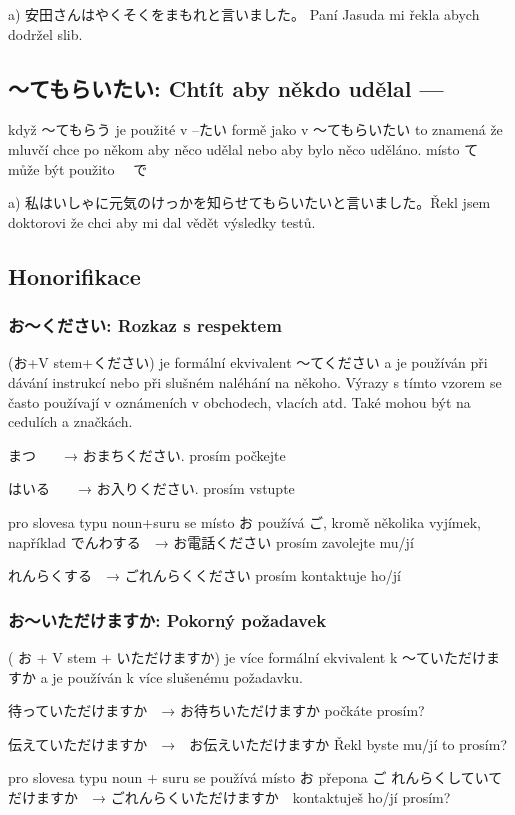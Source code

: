 a) 安田さんはやくそくをまもれと言いました。 Paní Jasuda mi řekla abych dodržel slib.

\subsection{〜てもらいたい: Chtít aby někdo udělal ---}

když 〜てもらう je použité v --たい formě jako v 〜てもらいたい to znamená že mluvčí chce po někom aby něco udělal nebo aby bylo něco uděláno. místo て může být použito 　で

a) 私はいしゃに元気のけっかを知らせてもらいたいと言いました。Řekl jsem doktorovi že chci aby mi dal vědět výsledky testů.

\subsection{Honorifikace}

\subsubsection{お〜ください: Rozkaz s respektem}
(お+V stem+ください) je formální ekvivalent 〜てください a je používán při dávání instrukcí nebo při slušném naléhání na někoho. Výrazy s tímto vzorem se často používají v oznámeních v obchodech, vlacích atd. Také mohou být na cedulích a značkách.

まつ　　→   おまちください.    prosím počkejte

はいる　　→  お入りください.  prosím vstupte

pro slovesa typu noun+suru se místo お používá ご, kromě několika vyjímek, například でんわする　→ お電話ください prosím zavolejte mu/jí


れんらくする　→ ごれんらくください prosím kontaktuje ho/jí

\subsubsection{お〜いただけますか: Pokorný požadavek}
( お + V stem + いただけますか) je více formální ekvivalent k 〜ていただけますか a je používán k více slušenému požadavku.

待っていただけますか　→  お待ちいただけますか počkáte prosím?

伝えていただけますか　→　お伝えいただけますか Řekl byste mu/jí to prosím?

pro slovesa typu noun + suru se používá místo お  přepona ご
れんらくしていてだけますか　→   ごれんらくいただけますか　kontaktuješ ho/jí prosím?
